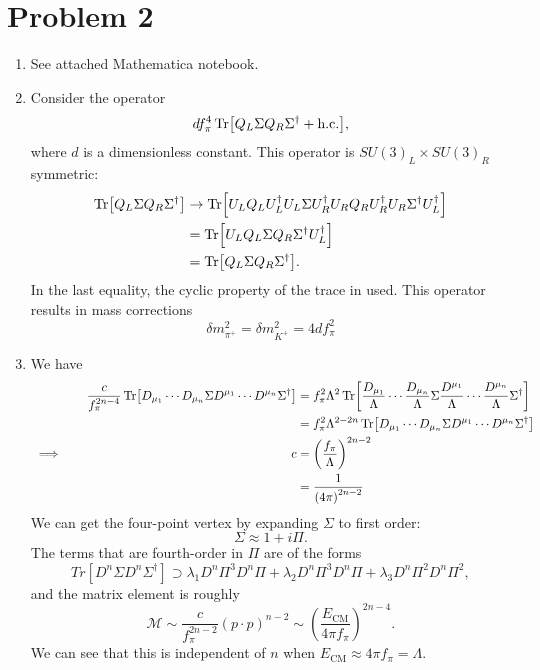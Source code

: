 \documentclass[12pt]{article}
\begin{document}
\section*{Problem 2}
\begin{enumerate}[label=(\alph*)]
    \item See attached Mathematica notebook.
    \item Consider the operator
    \[ df_\pi^4\Tr[Q_L\Sigma Q_R \Sigma^\dag + \text{h.c.}], \]
    where $d$ is a dimensionless constant. This operator is $SU(3)_L \times SU(3)_R$ symmetric:
    \begin{align*}
        \Tr[Q_L\Sigma Q_R \Sigma^\dag] &\to \Tr[U_LQ_LU_L^\dag U_L \Sigma U_R^\dag U_RQ_RU_R^\dag U_R\Sigma^\dag U_L^\dag] \\
        & = \Tr[U_LQ_L\Sigma Q_R \Sigma^\dag U_L^\dag] \\
        &= \Tr[Q_L\Sigma Q_R \Sigma^\dag].
    \end{align*}
    In the last equality, the cyclic property of the trace in used. This operator results in mass corrections
    \[ \delta m_{\pi^+}^2 = \delta m_{K^+}^2 = 4df_\pi^2 \]

    \item We have
    \begin{alignat*}{3}
        &\quad & \frac{c}{f_\pi^{2n-4}}\Tr[D_{\mu_1}\cdots D_{\mu_n}\Sigma D^{\mu_1}\cdots D^{\mu_n}\Sigma^\dag] &= f_\pi^2\Lambda^2\Tr[\frac{D_{\mu_1}}{\Lambda}\cdots\frac{D_{\mu_n}}{\Lambda}\Sigma\frac{D^{\mu_1}}{\Lambda}\cdots\frac{D^{\mu_n}}{\Lambda}\Sigma^\dag] \\
        &\quad &  &= f_\pi^2\Lambda^{2-2n}\Tr[D_{\mu_1}\cdots D_{\mu_n}\Sigma D^{\mu_1}\cdots D^{\mu_n}\Sigma^\dag] \\
        &\implies\quad & c &= \left(\frac{f_\pi}{\Lambda}\right)^{2n-2} \\
        &\quad &  &= \frac{1}{\left(4\pi\right)^{2n-2}}
    \end{alignat*}
    We can get the four-point vertex by expanding $\Sigma$ to first order:
    \[ \Sigma \approx 1 + i\Pi. \]
    The terms that are fourth-order in $\Pi$ are of the forms
    \[ Tr[D^n\Sigma D^n\Sigma^\dag] \supset \lambda_1 D^n\Pi^3D^n\Pi + \lambda_2 D^n\Pi^3D^n\Pi + \lambda_3 D^n\Pi^2D^n\Pi^2, \]
    and the matrix element is roughly
    \[ \mathcal{M} \sim \frac{c}{f_\pi^{2n-2}}(p\cdot p)^{n-2} \sim \left(\frac{E_\text{CM}}{4\pi f_\pi}\right)^{2n-4}. \]
    We can see that this is independent of $n$ when $E_\text{CM} \approx 4\pi f_\pi = \Lambda$.
\end{enumerate}



\end{document}
